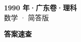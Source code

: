 \documentclass[zihao=-4, a4paper]{ctexart}
\begin{document}
\begin{center}
  {\Large\bfseries 1990 年·广东卷·理科}\\[4pt]
  {\large 数学 · 简答版}
\end{center}
\medskip
{}

\clearpage
{}
\begin{center}{\Large\bfseries 答案速查}\end{center}
\medskip

\end{document}
